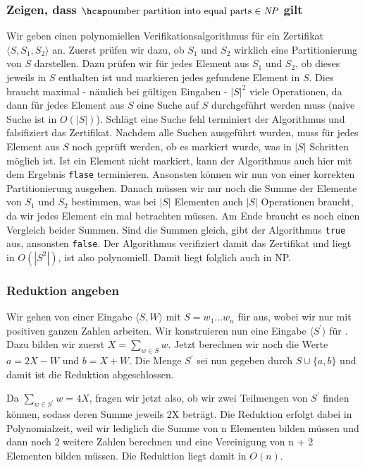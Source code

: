 \documentclass[a4paper]{article}
\begin{document}
			\subsubsection{Zeigen, dass $\numberpartition\;\in\np$ gilt}
			Wir geben einen polynomiellen Verifikationsalgorithmus für ein Zertifikat $\langle S, S_1, S_2 \rangle$ an. \n
			Zuerst prüfen wir dazu, ob $S_1$ und $S_2$ wirklich eine Partitionierung von $S$ darstellen. Dazu prüfen wir für jedes Element aus $S_1$ und $S_2$, ob dieses jeweils in $S$ enthalten ist und markieren jedes gefundene Element in $S$. Dies braucht maximal - nämlich bei gültigen Eingaben - $|S|^2$ viele Operationen, da dann für jedes Element aus $S$ eine Suche auf $S$ durchgeführt werden muss (naive Suche ist in $O(|S|)$). Schlägt eine Suche fehl terminiert der Algorithmus und falsifiziert das Zertifikat. Nachdem alle Suchen ausgeführt wurden, muss für jedes Element aus $S$ noch geprüft werden, ob es markiert wurde, was in $|S|$ Schritten möglich ist. Ist ein Element nicht markiert, kann der Algorithmus auch hier mit dem Ergebnis \texttt{flase} terminieren. Ansonsten können wir nun von einer korrekten Partitionierung ausgehen.\n
			Danach müssen wir nur noch die Summe der Elemente von $S_1$ und $S_2$ bestimmen, was bei $|S|$ Elementen auch $|S|$ Operationen braucht, da wir jedes Element ein mal betrachten müssen. Am Ende braucht es noch einen Vergleich beider Summen. Sind die Summen gleich, gibt der Algorithmus \texttt{true} aus, ansonsten \texttt{false}.\n
			Der Algorithmus verifiziert damit das Zertifikat und liegt in $O(|S^2|)$, ist also polynomiell. Damit liegt \numberpartition folglich auch in NP.
			\subsubsection{Reduktion angeben}
			Wir gehen von einer Eingabe $\langle S, W \rangle$ mit $S = w_1 \dots w_n$ für \numberpartition aus, wobei wir nur mit positiven ganzen Zahlen arbeiten. \n
			Wir konstruieren nun eine Eingabe $\langle S^\prime \rangle$ für \subsetsum. \n
			Dazu bilden wir zuerst $X = \sum\limits_{w \in S} w$. \n
			Jetzt berechnen wir noch die Werte $a = 2X - W$ und $b = X + W$. \n
			Die Menge $S^\prime$ sei nun gegeben durch $S \cup \{a, b\}$ und damit ist die Reduktion abgeschlossen. \n
			
			Da $\sum\limits_{w \in S^\prime} w = 4X$, fragen wir jetzt also, ob wir zwei Teilmengen von $S^\prime$ finden können, sodass deren Summe jeweils 2X beträgt. \n
			Die Reduktion erfolgt dabei in Polynomialzeit, weil wir lediglich die Summe von n Elementen bilden müssen und dann noch 2 weitere Zahlen berechnen und eine Vereinigung von n + 2 Elementen bilden müssen. Die Reduktion liegt damit in $O(n)$.
			
\end{document}
